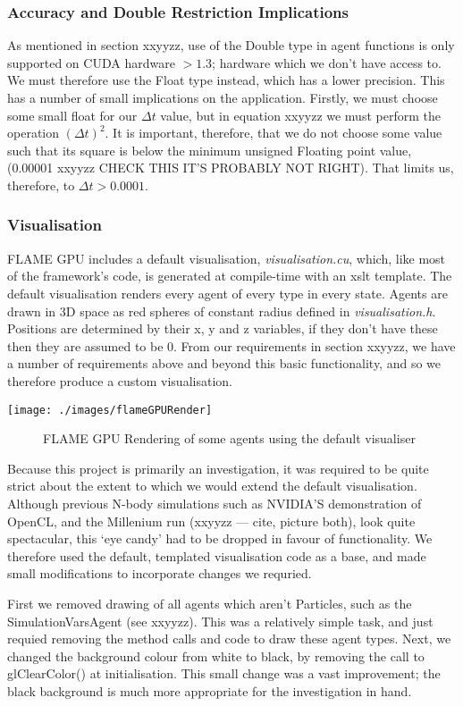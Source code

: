 \documentclass[11pt,a4paper]{article}
\begin{document}
\subsubsection{Accuracy and Double Restriction Implications}
As mentioned in section xxyyzz, use of the Double type in agent functions is only supported on CUDA hardware $>1.3$; hardware which we don't have access to. We must therefore use the Float type instead, which has a lower precision. This has a number of small implications on the application. Firstly, we must choose some small float for our $\Delta t$ value, but in equation xxyyzz we must perform the operation $(\Delta t)^2$. It is important, therefore, that we do not choose some value such that its square is below the minimum unsigned Floating point value, (0.00001 xxyyzz CHECK THIS IT'S PROBABLY NOT RIGHT). That limits us, therefore, to $\Delta t>0.0001$. 


\subsubsection{Visualisation}
FLAME GPU includes a default visualisation, \emph{visualisation.cu}, which, like most of the framework's code, is generated at compile-time with an xslt template. The default visualisation renders every agent of every type in every state. Agents are drawn in 3D space as red spheres of constant radius defined in \emph{visualisation.h}. Positions are determined by their x, y and z variables, if they don't have these then they are assumed to be 0. From our requirements in section xxyyzz, we have a number of requirements above and beyond this basic functionality, and so we therefore produce a custom visualisation.

\texttt{[image: ./images/flameGPURender]}
\begin{figure}[h!]
\caption[FLAME GPU Default rendering]{FLAME GPU Rendering of some agents using the default visualiser}
\end{figure}
Because this project is primarily an investigation, it was required to be quite strict about the extent to which we would extend the default visualisation. Although previous N-body simulations such as NVIDIA'S demonstration of OpenCL, and the Millenium run (xxyyzz --- cite, picture both), look quite spectacular, this `eye candy' had to be dropped in favour of functionality. We therefore used the default, templated visualisation code as a base, and made small modifications to incorporate changes we requried.

First we removed drawing of all agents which aren't Particles, such as the SimulationVarsAgent (see xxyyzz). This was a relatively simple task, and just requied removing the method calls and code to draw these agent types. Next, we changed the background colour from white to black, by removing the call to glClearColor() at initialisation. This small change was a vast improvement; the black background is much more appropriate for the investigation in hand. 
\end{document}
